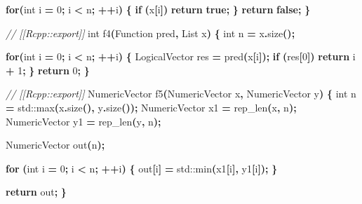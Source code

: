 \documentclass[
]{book}
\newenvironment{Shaded}{\begin{snugshade}}{\end{snugshade}}
\newcommand{\BuiltInTok}[1]{#1}
\newcommand{\CommentTok}[1]{\textcolor[rgb]{0.56,0.35,0.01}{\textit{#1}}}
\newcommand{\ControlFlowTok}[1]{\textcolor[rgb]{0.13,0.29,0.53}{\textbf{#1}}}
\newcommand{\DataTypeTok}[1]{\textcolor[rgb]{0.13,0.29,0.53}{#1}}
\newcommand{\DecValTok}[1]{\textcolor[rgb]{0.00,0.00,0.81}{#1}}
\newcommand{\KeywordTok}[1]{\textcolor[rgb]{0.13,0.29,0.53}{\textbf{#1}}}
\newcommand{\NormalTok}[1]{#1}
\newcommand{\OperatorTok}[1]{\textcolor[rgb]{0.81,0.36,0.00}{\textbf{#1}}}
\begin{document}
\begin{Shaded}
\begin{Highlighting}[]
  \ControlFlowTok{for}\OperatorTok{(}\DataTypeTok{int}\NormalTok{ i }\OperatorTok{=} \DecValTok{0}\OperatorTok{;}\NormalTok{ i }\OperatorTok{\textless{}}\NormalTok{ n}\OperatorTok{;} \OperatorTok{++}\NormalTok{i}\OperatorTok{)} \OperatorTok{\{}
    \ControlFlowTok{if} \OperatorTok{(}\NormalTok{x}\OperatorTok{[}\NormalTok{i}\OperatorTok{])} \ControlFlowTok{return} \KeywordTok{true}\OperatorTok{;}
  \OperatorTok{\}}
  \ControlFlowTok{return} \KeywordTok{false}\OperatorTok{;}
\OperatorTok{\}}

\CommentTok{// [[Rcpp::export]]}
\DataTypeTok{int}\NormalTok{ f4}\OperatorTok{(}\NormalTok{Function pred}\OperatorTok{,}\NormalTok{ List x}\OperatorTok{)} \OperatorTok{\{}
  \DataTypeTok{int}\NormalTok{ n }\OperatorTok{=}\NormalTok{ x}\OperatorTok{.}\NormalTok{size}\OperatorTok{();}

  \ControlFlowTok{for}\OperatorTok{(}\DataTypeTok{int}\NormalTok{ i }\OperatorTok{=} \DecValTok{0}\OperatorTok{;}\NormalTok{ i }\OperatorTok{\textless{}}\NormalTok{ n}\OperatorTok{;} \OperatorTok{++}\NormalTok{i}\OperatorTok{)} \OperatorTok{\{}
\NormalTok{    LogicalVector res }\OperatorTok{=}\NormalTok{ pred}\OperatorTok{(}\NormalTok{x}\OperatorTok{[}\NormalTok{i}\OperatorTok{]);}
    \ControlFlowTok{if} \OperatorTok{(}\NormalTok{res}\OperatorTok{[}\DecValTok{0}\OperatorTok{])} \ControlFlowTok{return}\NormalTok{ i }\OperatorTok{+} \DecValTok{1}\OperatorTok{;}
  \OperatorTok{\}}
  \ControlFlowTok{return} \DecValTok{0}\OperatorTok{;}
\OperatorTok{\}}

\CommentTok{// [[Rcpp::export]]}
\NormalTok{NumericVector f5}\OperatorTok{(}\NormalTok{NumericVector x}\OperatorTok{,}\NormalTok{ NumericVector y}\OperatorTok{)} \OperatorTok{\{}
  \DataTypeTok{int}\NormalTok{ n }\OperatorTok{=} \BuiltInTok{std::}\NormalTok{max}\OperatorTok{(}\NormalTok{x}\OperatorTok{.}\NormalTok{size}\OperatorTok{(),}\NormalTok{ y}\OperatorTok{.}\NormalTok{size}\OperatorTok{());}
\NormalTok{  NumericVector x1 }\OperatorTok{=}\NormalTok{ rep\_len}\OperatorTok{(}\NormalTok{x}\OperatorTok{,}\NormalTok{ n}\OperatorTok{);}
\NormalTok{  NumericVector y1 }\OperatorTok{=}\NormalTok{ rep\_len}\OperatorTok{(}\NormalTok{y}\OperatorTok{,}\NormalTok{ n}\OperatorTok{);}

\NormalTok{  NumericVector out}\OperatorTok{(}\NormalTok{n}\OperatorTok{);}

  \ControlFlowTok{for} \OperatorTok{(}\DataTypeTok{int}\NormalTok{ i }\OperatorTok{=} \DecValTok{0}\OperatorTok{;}\NormalTok{ i }\OperatorTok{\textless{}}\NormalTok{ n}\OperatorTok{;} \OperatorTok{++}\NormalTok{i}\OperatorTok{)} \OperatorTok{\{}
\NormalTok{    out}\OperatorTok{[}\NormalTok{i}\OperatorTok{]} \OperatorTok{=} \BuiltInTok{std::}\NormalTok{min}\OperatorTok{(}\NormalTok{x1}\OperatorTok{[}\NormalTok{i}\OperatorTok{],}\NormalTok{ y1}\OperatorTok{[}\NormalTok{i}\OperatorTok{]);}
  \OperatorTok{\}}

  \ControlFlowTok{return}\NormalTok{ out}\OperatorTok{;}
\OperatorTok{\}}
\end{Highlighting}
\end{Shaded}
\end{document}
